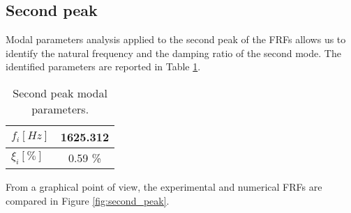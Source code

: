 \subsection{Second peak}
\label{subsec:second_peak}

Modal parameters analysis applied to the second peak of the FRFs allows us to identify the natural frequency and the damping ratio of the second mode.
The identified parameters are reported in Table \ref{tab:second_peak}.

\begin{table}[H]
    \centering
    \begin{tabular}{lc}
        \hline
        $f_i [Hz]$ & 1625.312 \\
        \hline
        $\xi_i [\%]$       & 0.59 \%     \\
        \hline
    \end{tabular}
    \caption{Second peak modal parameters.}
    \label{tab:second_peak}
\end{table}

From a graphical point of view, the experimental and numerical FRFs are compared in Figure \ref{fig:second_peak}.
